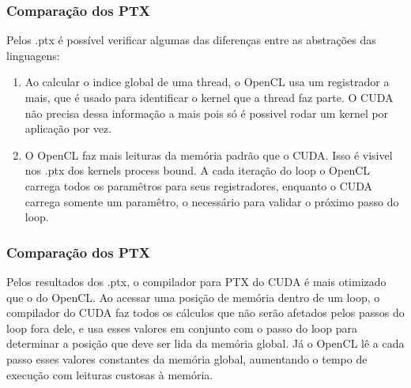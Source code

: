 \documentclass[brazil]{beamer}
\begin{document}
\begin{frame}[fragile]
  \frametitle{Comparação dos PTX}
  Pelos .ptx é possível verificar algumas das diferenças entre as abstrações das linguagens:
  \begin{enumerate}
    \item Ao calcular o indice global de uma thread, o OpenCL usa um registrador a mais, que é usado para identificar o kernel que a thread faz parte. O CUDA não
      precisa dessa informação a mais pois só é possivel rodar um kernel por aplicação por vez.
    \item O OpenCL faz mais leituras da memória padrão que o CUDA. Isso é visivel nos .ptx dos kernels process bound. A cada iteração do loop o OpenCL
      carrega todos os paramêtros para seus registradores, enquanto o CUDA carrega somente um paramêtro, o necessário para validar o próximo passo do loop.
  \end{enumerate}
\end{frame}

\begin{frame}
  \frametitle{Comparação dos PTX}
  Pelos resultados dos .ptx, o compilador para PTX do CUDA é mais otimizado que o do OpenCL. Ao acessar uma posição de memória dentro de um loop, o compilador
  do CUDA faz todos os cálculos que não serão afetados pelos passos do loop fora dele, e usa esses valores em conjunto com o passo do loop para determinar a
  posição que deve ser lida da memória global. Já o OpenCL lê a cada passo esses valores constantes da memória global, aumentando o tempo de execução com
  leituras custosas à memória.
\end{frame}
\end{document}
